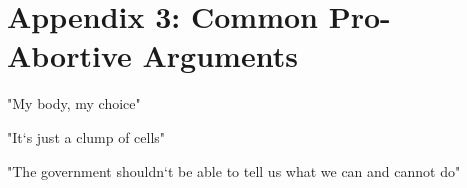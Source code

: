 \chapter{Appendix 3: Common Pro-Abortive Arguments}

"My body, my choice"

"It`s just a clump of cells"

"The government shouldn`t be able to tell us what we can and cannot do"

